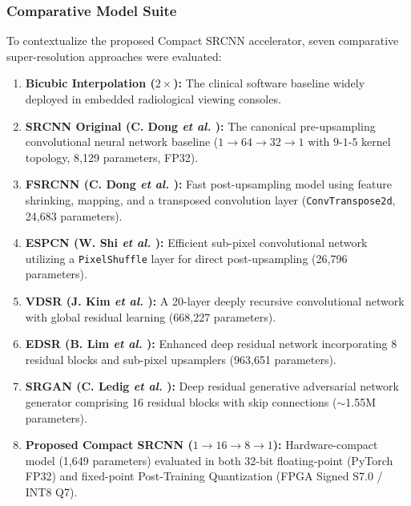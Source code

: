 \documentclass[conference]{IEEEtran}
\begin{document}
\subsubsection{Comparative Model Suite}
To contextualize the proposed Compact SRCNN accelerator, seven comparative super-resolution approaches were evaluated:
\begin{enumerate}
    \item \textbf{Bicubic Interpolation ($2\times$):} The clinical software baseline widely deployed in embedded radiological viewing consoles.
    \item \textbf{SRCNN Original (C. Dong \textit{et al.} \cite{dong2014learning}):} The canonical pre-upsampling convolutional neural network baseline ($1 \rightarrow 64 \rightarrow 32 \rightarrow 1$ with $9\text{-}1\text{-}5$ kernel topology, 8,129 parameters, FP32).
    \item \textbf{FSRCNN (C. Dong \textit{et al.} \cite{dong2016accelerating}):} Fast post-upsampling model using feature shrinking, mapping, and a transposed convolution layer (\texttt{ConvTranspose2d}, 24,683 parameters).
    \item \textbf{ESPCN (W. Shi \textit{et al.} \cite{shi2016real}):} Efficient sub-pixel convolutional network utilizing a \texttt{PixelShuffle} layer for direct post-upsampling (26,796 parameters).
    \item \textbf{VDSR (J. Kim \textit{et al.} \cite{kim2016accurate}):} A 20-layer deeply recursive convolutional network with global residual learning (668,227 parameters).
    \item \textbf{EDSR (B. Lim \textit{et al.} \cite{lim2017enhanced}):} Enhanced deep residual network incorporating 8 residual blocks and sub-pixel upsamplers (963,651 parameters).
    \item \textbf{SRGAN (C. Ledig \textit{et al.} \cite{ledig2017photo}):} Deep residual generative adversarial network generator comprising 16 residual blocks with skip connections ($\sim$1.55M parameters).
    \item \textbf{Proposed Compact SRCNN ($1 \rightarrow 16 \rightarrow 8 \rightarrow 1$):} Hardware-compact model (1,649 parameters) evaluated in both 32-bit floating-point (PyTorch FP32) and fixed-point Post-Training Quantization (FPGA Signed S7.0 / INT8 Q7).
\end{enumerate}

\end{document}
